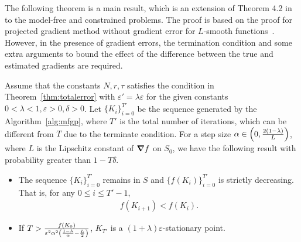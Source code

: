 The following theorem is a main result, which is an extension of Theorem 4.2 in~\cite{fatkhullin2021optimizing} to the model-free and constrained problems. 
The proof is based on the proof for projected gradient method without gradient error for $L$-smooth functions~\cite{beck2017first}. However, in the presence of gradient errors, the termination condition and some extra arguments to bound the effect of the difference between the true and estimated gradients are required.

\begin{theorem}\label{thm:modelfreeconvergence}
  Assume that the constants $N, r, \tau$ satisfies the condition in Theorem~\ref{thm:totalerror} with $\varepsilon' = \lambda \varepsilon$
  for the given constants $0<\lambda<1, \varepsilon > 0, \delta > 0$.
  Let $\{K_i\}_{i=0}^{T'}$ be the sequence generated by the Algorithm~\ref{alg:mfgp},
  where $T'$ is the total number of iterations, which can be different from $T$ due to the terminate condition.
  For a step size $\alpha \in \qty(0, \frac{2(1-\lambda)}{L})$,
  where $L$ is the Lipschitz constant of $\grad f$ on $S_0$,
  we have the following result with probability greater than $1-T\delta$.
  \begin{itemize}
    \item The sequence $\{K_i\}_{i=0}^{T'}$ remains in $S$ and $\{f(K_i)\}_{i=0}^{T'}$ is strictly decreasing. That is, for any $0\leq i\leq T'-1$,
          \begin{align}
            f(K_{i+1}) < f(K_i).\label{eq:tmp4}
          \end{align}
    \item If $T > \frac{f(K_0)}{\varepsilon^2\alpha^2\qty(\frac{1-\lambda}{\alpha}-\frac{L}{2})}$,
          $K_{T'}$ is a $(1+\lambda)\varepsilon$-stationary point.
  \end{itemize}
\end{theorem}
